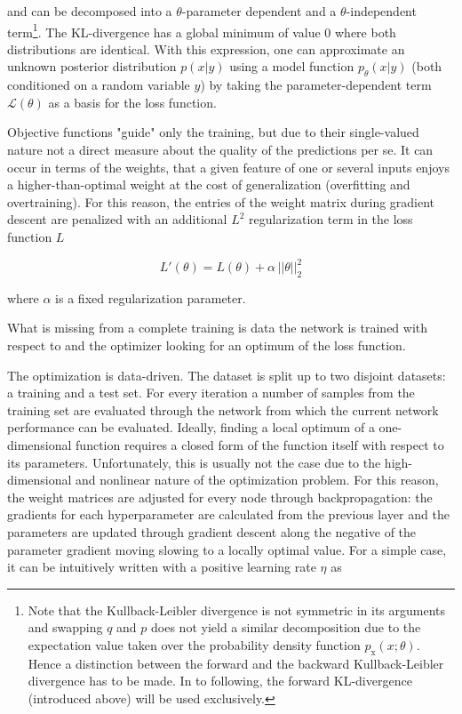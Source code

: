 and can be decomposed into a $\theta$-parameter dependent and a $\theta$-independent term\footnote{Note that the Kullback-Leibler divergence is not symmetric in its arguments and swapping $q$ and $p$ does not yield a similar decomposition due to the expectation value taken over the probability density function $p_\text{x}(x; \theta)$. Hence a distinction between the forward and the backward Kullback-Leibler divergence has to be made. In to following, the forward KL-divergence (introduced above) will be used exclusively.}. The KL-divergence has a global minimum of value 0 where both distributions are identical. With this expression, one can approximate an unknown posterior distribution $p(x | y)$ using a model function $p_\theta(x | y)$ (both conditioned on a random variable $y$) by taking the parameter-dependent term $\mathcal{L}(\theta)$ as a basis for the loss function.

Objective functions "guide" only the training, but due to their single-valued nature not a direct measure about the quality of the predictions per se. It can occur in terms of the weights, that a given feature of one or several inputs enjoys a higher-than-optimal weight at the cost of generalization (overfitting and overtraining). For this reason, the entries of the weight matrix during gradient descent are penalized with an additional $L^2$ regularization term in the loss function $L$

\begin{equation}
	L'(\theta) = L(\theta) + \alpha \, ||\theta|| _2^2
\end{equation}

where $\alpha$ is a fixed regularization parameter.

What is missing from a complete training is data the network is trained with respect to and the optimizer looking for an optimum of the loss function.



The optimization is data-driven. The dataset is split up to two disjoint datasets: a training and a test set. For every iteration a number of samples from the training set are evaluated through the network from which the current network performance can be evaluated. Ideally, finding a local optimum of a one-dimensional function requires a closed form of the function itself with respect to its parameters. Unfortunately, this is usually not the case due to the high-dimensional and nonlinear nature of the optimization problem. For this reason, the weight matrices are adjusted for every node through backpropagation: the gradients for each hyperparameter are calculated from the previous layer and the parameters are updated through gradient descent along the negative of the parameter gradient moving slowing to a locally optimal value. For a simple case, it can be intuitively written with a positive learning rate $\eta$ as

